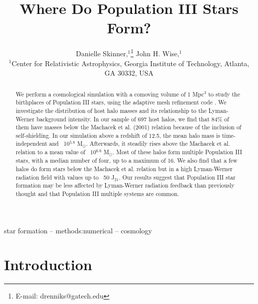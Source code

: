 \documentclass[a4paper,fleqn,usenatbib]{mnras}
\title[Where Do Pop III Stars Form?]{Where Do Population III Stars Form?}
\author[Danielle Skinner et al.]{
Danielle Skinner,$^{1}$\thanks{E-mail: drenniks@gatech.edu}
John H. Wise,$^{1}$
\\
$^{1}$Center for Relativistic Astrophysics, Georgia Institute of Technology, 
Atlanta, GA 30332, USA\\
}
\begin{document}
\label{firstpage}
\pagerange{\pageref{firstpage}--\pageref{lastpage}}
\maketitle

\begin{abstract}
We perform a cosmological simulation with a comoving volume of 1 Mpc$^{3}$ to study the birthplaces of Population III stars, using the adaptive mesh refinement code \enzo{}. We investigate the distribution of host halo masses and its relationship to the Lyman-Werner background intensity.  In our sample of 697 host halos, we find that 84\% of them have masses below the Machacek et al. (2001) relation because of the inclusion of \hh{} self-shielding.  In our simulation above a redshift of 12.5, the mean halo mass is time-independent and ~10$^{5.8}$ M$_{\odot}$. Afterwards, it steadily rises above the Machacek et al. relation to a mean value of ~10$^{6.6}$ M$_{\odot}$. Most of these halos form multiple Population III stars, with a median number of four, up to a maximum of 16. We also find that a few halos do form stars below the Machacek et al. relation but in a high Lyman-Werner radiation field with values up to ~50 J$_{21}$. Our results suggest that Population III star formation may be less affected by Lyman-Werner radiation feedback than previously thought and that Population III multiple systems are common.
\end{abstract}

\begin{keywords}
star formation -- methods:numerical -- cosmology
\end{keywords}


\section{Introduction}
\end{document}

